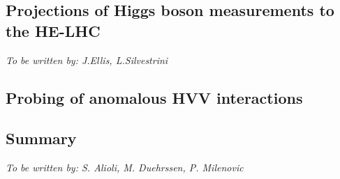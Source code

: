 \documentclass[../report.tex]{subfiles}
\providecommand{\main}{..}
\begin{document}
\subsection{Projections of Higgs boson measurements to the HE-LHC}
\label{sec:2:HE_LHC_Higgs_projections}
{\it To be written by: J.Ellis, L.Silvestrini}


\subsection{Probing of anomalous HVV interactions}
\label{sec:2:anomalous_HVV}


\subsection{Summary}
\begin{center}{\it To be written by: S. Alioli, M. Duehrssen, P. Milenovic} \end{center}
\end{document}
